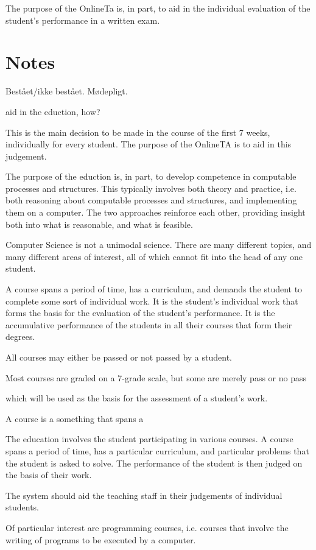 The purpose of the OnlineTa is, in part, to aid in the individual evaluation of
the student's performance in a written exam.

\section{Notes}

Bestået/ikke bestået. Mødepligt.

aid in the eduction, how?

This is the
main decision to be made in the course of the first 7 weeks, individually for
every student. The purpose of the OnlineTA is to aid in this judgement.

The purpose of the eduction is, in part, to develop competence in computable
processes and structures. This typically involves both theory and practice,
i.e. both reasoning about computable processes and structures, and implementing
them on a computer. The two approaches reinforce each other, providing insight
both into what is reasonable, and what is feasible.


Computer Science is not a unimodal science. There are many different topics,
and many different areas of interest, all of which cannot fit into the head of
any one student.

A course spans a period of time, has a curriculum, and demands the student to
complete some sort of individual work. It is the student's individual work that
forms the basis for the evaluation of the student's performance. It is the
accumulative performance of the students in all their courses that form their
degrees.

All courses may either be passed or not passed by a student.

Most courses are graded on a 7-grade scale, but some are merely pass or no pass

 which will be used as the basis for the assessment of a student's work.

A course is a something that spans a 

The education involves the student participating in various courses. A course
spans a period of time, has a particular curriculum, and particular problems
that the student is asked to solve. The performance of the student is then
judged on the basis of their work.

 The system
should aid the teaching staff in their judgements of individual students.

Of particular interest are programming courses, i.e. courses that involve the
writing of programs to be executed by a computer.
